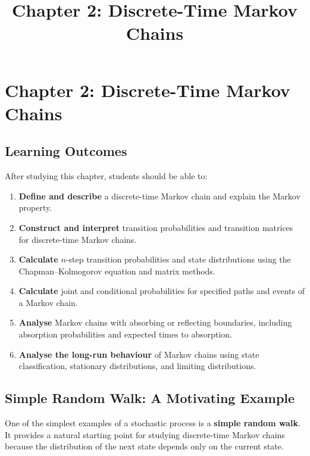 \documentclass[
  letterpaper,
  DIV=11,
  numbers=noendperiod]{scrartcl}
\title{Chapter 2: Discrete-Time Markov Chains}
\author{}
\date{}
\providecommand{\tightlist}{%
  \setlength{\itemsep}{0pt}\setlength{\parskip}{0pt}}
\renewcommand*\contentsname{Table of contents}
\newcommand\contentsname{Table of contents}
\theoremstyle{definition}
\theoremstyle{remark}
\begin{document}
\maketitle

\renewcommand*\contentsname{Table of contents}
{
\setcounter{tocdepth}{3}
\tableofcontents
}

\section{Chapter 2: Discrete-Time Markov
Chains}\label{chapter-2-discrete-time-markov-chains}

\subsection*{Learning Outcomes}\label{learning-outcomes}

After studying this chapter, students should be able to:

\begin{enumerate}
\def\labelenumi{\arabic{enumi}.}
\tightlist
\item
  \textbf{Define and describe} a discrete-time Markov chain and explain
  the Markov property.
\item
  \textbf{Construct and interpret} transition probabilities and
  transition matrices for discrete-time Markov chains.
\item
  \textbf{Calculate} \(n\)-step transition probabilities and state
  distributions using the Chapman--Kolmogorov equation and matrix
  methods.
\item
  \textbf{Calculate} joint and conditional probabilities for specified
  paths and events of a Markov chain.
\item
  \textbf{Analyse} Markov chains with absorbing or reflecting
  boundaries, including absorption probabilities and expected times to
  absorption.
\item
  \textbf{Analyse the long-run behaviour} of Markov chains using state
  classification, stationary distributions, and limiting distributions.
\end{enumerate}

\subsection{Simple Random Walk: A Motivating
Example}\label{simple-random-walk-a-motivating-example}

One of the simplest examples of a stochastic process is a \textbf{simple
random walk}. It provides a natural starting point for studying
discrete-time Markov chains because the distribution of the next state
depends only on the current state.
\end{document}
